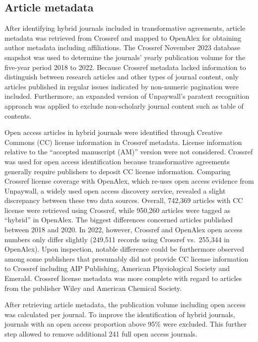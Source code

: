 \documentclass[a4paper,man,floatsintext,longtable,noextraspace,12pt]{apa6}
\begin{document}
\hypertarget{article-metadata}{%
\subsection{Article metadata}\label{article-metadata}}

After identifying hybrid journals included in transformative agreements,
article metadata was retrieved from Crossref and mapped to OpenAlex for
obtaining author metadata including affiliations. The Crossref November
2023 database snapshot was used to determine the journals' yearly
publication volume for the five-year period 2018 to 2022. Because
Crossref metadata lacked information to distinguish between research
articles and other types of journal content, only articles published in
regular issues indicated by non-numeric pagination were included.
Furthermore, an expanded version of Unpaywall's paratext recognition
approach was applied to exclude non-scholarly journal content such as
table of contents.

Open access articles in hybrid journals were identified through Creative
Commons (CC) license information in Crossref metadata. License
information relative to the ``accepted manuscript (AM)'' version were
not considered. Crossref was used for open access identification because
transformative agreements generally require publishers to deposit CC
license information. Comparing Crossref license coverage with OpenAlex,
which re-uses open access evidence from Unpaywall, a widely used open
access discovery service, revealed a slight discrepancy between these
two data sources. Overall, 742,369 articles with CC license were
retrieved using Crossref, while 950,260 articles were tagged as
``hybrid'' in OpenAlex. The biggest differences concerned articles
published between 2018 and 2020. In 2022, however, Crossref and OpenAlex
open access numbers only differ slightly (249,511 records using Crossref
vs.~255,344 in OpenAlex). Upon inspection, notable difference could be
furthermore observed among some publishers that presumably did not
provide CC license information to Crossref including AIP Publishing,
American Physiological Society and Emerald. Crossref license metadata
was more complete with regard to articles from the publisher Wiley and
American Chemical Society.

After retrieving article metadata, the publication volume including open
access was calculated per journal. To improve the identification of
hybrid journals, journals with an open access proportion above 95\% were
excluded. This further step allowed to remove additional 241 full open
access journals.
\end{document}
